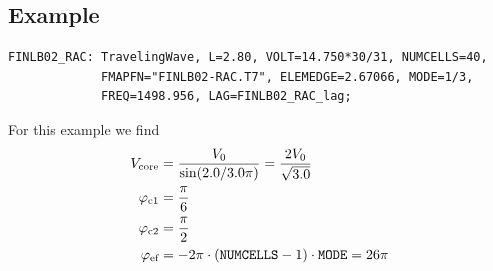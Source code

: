 \subsection*{Example}
\begin{fmpage}
\begin{verbatim}
FINLB02_RAC: TravelingWave, L=2.80, VOLT=14.750*30/31, NUMCELLS=40,
             FMAPFN="FINLB02-RAC.T7", ELEMEDGE=2.67066, MODE=1/3,
             FREQ=1498.956, LAG=FINLB02_RAC_lag;
\end{verbatim}
\end{fmpage}
For this example we find
\begin{align*}
  V_\text{core} &= \frac{V_{0}}{\sin(2.0/3.0 \pi)} = \frac{2 V_{0}}{\sqrt{3.0}}\\
  \varphi_\text{c1} &= \frac{\pi}{6}\\
  \varphi_\text{c2} &= \frac{\pi}{2}\\
  \varphi_\text{ef} &= - 2\pi \cdot(\text{\keyword{NUMCELLS}} - 1) \cdot \text{\keyword{MODE}} = 26\pi
\end{align*}
